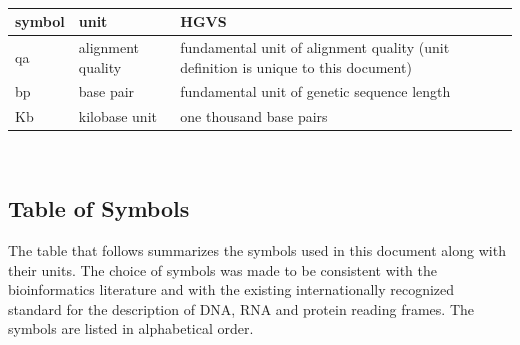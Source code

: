 \documentclass[12pt]{article}
\begin{document}
~\newline

\renewcommand{\arraystretch}{1.2}
\begin{center}
  \begin{tabular}{l l l} 
    \toprule		
    \textbf{symbol} & \textbf{unit} & \textbf{HGVS}\\
    \midrule 
    qa & alignment quality & fundamental unit of alignment quality 
    (unit definition is unique to this document)
    \\
    bp & base pair & fundamental unit of genetic sequence length
    \\
    Kb & kilobase unit & one thousand base pairs
    \\
    \bottomrule
  \end{tabular}
\end{center}

~\newline





\subsection{Table of Symbols}

The table that follows summarizes the symbols used in this document along with
their units.  The choice of symbols was made to be consistent with the bioinformatics
literature and with the existing internationally recognized standard for the description
 of DNA, RNA and protein reading frames. The symbols are listed in alphabetical order.
\end{document}
